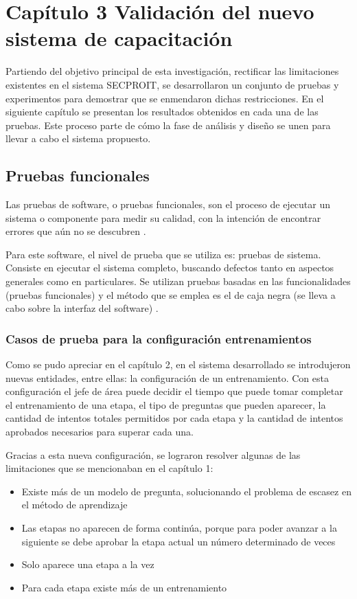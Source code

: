 \chapter*{Capítulo 3 \vspace{0.5cm} \break Validación del nuevo sistema de capacitación}
\setcounter{chapter}{3}
\setcounter{section}{0}

Partiendo del objetivo principal de esta investigación, rectificar las limitaciones existentes en el sistema SECPROIT, se desarrollaron un conjunto de pruebas y experimentos para demostrar que se enmendaron dichas restricciones. En el siguiente capítulo se presentan los resultados obtenidos en cada una de las pruebas. Este proceso parte de cómo la fase de análisis y diseño se unen para llevar a cabo el sistema propuesto.

\section{Pruebas funcionales}
 Las pruebas de software, o pruebas funcionales, son el proceso de ejecutar un sistema o componente para medir su calidad, con la intención de encontrar errores que aún no se descubren \cite{Buehler2008}.

Para este software, el nivel de prueba que se utiliza es: pruebas de sistema. Consiste en ejecutar el sistema completo, buscando defectos tanto en aspectos generales como en particulares. Se utilizan pruebas basadas en las funcionalidades (pruebas funcionales) y el método que se emplea es el de caja negra (se lleva a cabo sobre la interfaz del software) \cite{Nidhra2012}.

\subsection{Casos de prueba para la configuración entrenamientos}
Como se pudo apreciar en el capítulo 2, en el sistema desarrollado se introdujeron nuevas entidades, entre ellas: la configuración de un entrenamiento. Con esta configuración el jefe de área puede decidir el tiempo que puede tomar completar el entrenamiento de una etapa, el tipo de preguntas que pueden aparecer, la cantidad de intentos totales permitidos por cada etapa y la cantidad de intentos aprobados necesarios para superar cada una.

Gracias a esta nueva configuración, se lograron resolver algunas de las limitaciones que se mencionaban en el capítulo 1: 
\begin{itemize}
\item Existe más de un modelo de pregunta, solucionando el problema de escasez en el método de aprendizaje
\item Las etapas no aparecen de forma continúa, porque para poder avanzar a la siguiente se debe aprobar la etapa actual un número determinado de veces
\item Solo aparece una etapa a la vez
\item Para cada etapa existe más de un entrenamiento
\end{itemize}

